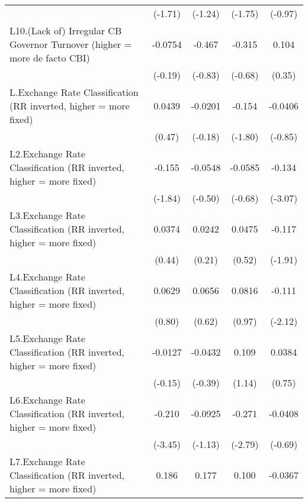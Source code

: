 {\begin{longtable}{l*{4}{c}}
                &  (-1.71)         &  (-1.24)         &  (-1.75)         &  (-0.97)         \\
\addlinespace
L10.(Lack of) Irregular CB Governor Turnover (higher = more de facto CBI)&  -0.0754         &   -0.467         &   -0.315         &    0.104         \\
                &  (-0.19)         &  (-0.83)         &  (-0.68)         &   (0.35)         \\
\addlinespace
L.Exchange Rate Classification (RR inverted, higher = more fixed)&   0.0439         &  -0.0201         &   -0.154         &  -0.0406         \\
                &   (0.47)         &  (-0.18)         &  (-1.80)         &  (-0.85)         \\
\addlinespace
L2.Exchange Rate Classification (RR inverted, higher = more fixed)&   -0.155         &  -0.0548         &  -0.0585         &   -0.134\sym{**} \\
                &  (-1.84)         &  (-0.50)         &  (-0.68)         &  (-3.07)         \\
\addlinespace
L3.Exchange Rate Classification (RR inverted, higher = more fixed)&   0.0374         &   0.0242         &   0.0475         &   -0.117         \\
                &   (0.44)         &   (0.21)         &   (0.52)         &  (-1.91)         \\
\addlinespace
L4.Exchange Rate Classification (RR inverted, higher = more fixed)&   0.0629         &   0.0656         &   0.0816         &   -0.111\sym{*}  \\
                &   (0.80)         &   (0.62)         &   (0.97)         &  (-2.12)         \\
\addlinespace
L5.Exchange Rate Classification (RR inverted, higher = more fixed)&  -0.0127         &  -0.0432         &    0.109         &   0.0384         \\
                &  (-0.15)         &  (-0.39)         &   (1.14)         &   (0.75)         \\
\addlinespace
L6.Exchange Rate Classification (RR inverted, higher = more fixed)&   -0.210\sym{***}&  -0.0925         &   -0.271\sym{**} &  -0.0408         \\
                &  (-3.45)         &  (-1.13)         &  (-2.79)         &  (-0.69)         \\
\addlinespace
L7.Exchange Rate Classification (RR inverted, higher = more fixed)&    0.186\sym{*}  &    0.177         &    0.100         &  -0.0367         \\

\end{longtable}}
